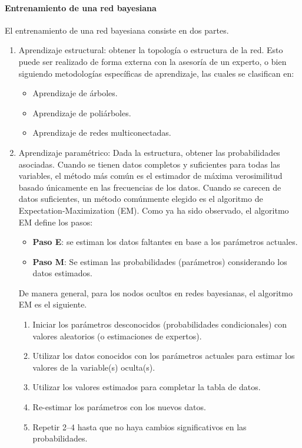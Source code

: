 \documentclass{article}
\begin{document}
\paragraph{Entrenamiento de una red bayesiana} 
\label{par:entrenamiento_de_una_red_bayesiana}
El entrenamiento de una red bayesiana consiste en dos partes.
\begin{enumerate}
	\item Aprendizaje estructural: obtener la topología o estructura de la red.
	Esto puede ser realizado de forma externa con la asesoría de un experto, o bien siguiendo metodologías específicas de aprendizaje, las cuales se clasifican en:
	\begin{itemize}
		\item Aprendizaje de árboles.
		\item Aprendizaje de poliárboles.
		\item Aprendizaje de redes multiconectadas.
	\end{itemize}
	\item Aprendizaje paramétrico: Dada la estructura, obtener las probabilidades asociadas.
	Cuando se tienen datos completos y suficientes para todas las variables, el método más común es el estimador de máxima verosimilitud basado únicamente en las frecuencias de los datos.
	Cuando se carecen de datos suficientes, un método comúnmente elegido es el algoritmo de Expectation-Maximization (EM).
	Como ya ha sido observado, el algoritmo EM define los pasos:
	\begin{itemize}
		\item \textbf{Paso E}: se estiman los datos faltantes en base a los parámetros actuales.
		\item \textbf{Paso M}: Se estiman las probabilidades (parámetros) considerando los datos estimados.
	\end{itemize}
	De manera general, para los nodos ocultos en redes bayesianas, el algoritmo EM es el siguiente.
	\begin{enumerate}
		\item Iniciar los parámetros desconocidos (probabilidades condicionales) con valores aleatorios (o estimaciones de expertos).
		\item  Utilizar los datos conocidos con los parámetros actuales para estimar los valores de la variable(s) oculta(s).
		\item Utilizar los valores estimados para completar la tabla de datos.
		\item Re-estimar los parámetros con los nuevos datos.
		\item Repetir 2–4 hasta que no haya cambios significativos en las probabilidades.
	\end{enumerate}
\end{enumerate}
\end{document}
